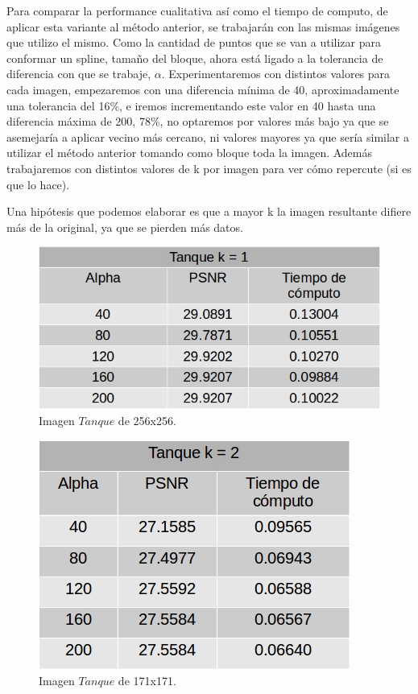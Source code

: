 \documentclass[a4paper]{article}
\begin{document}
Para comparar la performance cualitativa así como el tiempo de computo, de aplicar esta variante al método anterior, se trabajarán con las mismas imágenes que utilizo el mismo. Como la cantidad de puntos que se van a utilizar para conformar un spline, tamaño del bloque, ahora está ligado a la tolerancia de diferencia con que se trabaje, $\alpha$. Experimentaremos con distintos valores para cada imagen, empezaremos con una diferencia mínima de 40, aproximadamente una tolerancia del 16\%, e iremos incrementando este valor en 40 hasta una diferencia máxima de 200, 78\%, no optaremos por valores más bajo ya que se asemejaría a aplicar vecino más cercano, ni valores mayores ya que sería similar a utilizar el método anterior tomando como bloque toda la imagen. Además trabajaremos con distintos valores de k por imagen para ver cómo repercute (si es que lo hace).   

Una hipótesis que podemos elaborar es que a mayor k la imagen resultante difiere más de la original, ya que se pierden más datos.    



\begin{figure}[H]
    \centering
    \includegraphics[scale=0.4]{imagenes/tanque1.jpg}
    \caption{Imagen $Tanque$ de 256x256.}
	\label{tanquee}
    \end{figure}
	
\begin{figure}[H]
    \centering
    \includegraphics[scale=0.4]{imagenes/tanque2.jpg}
    \caption{Imagen $Tanque$ de 171x171.}
	\label{tanquee}
    \end{figure}
    
\end{document}
